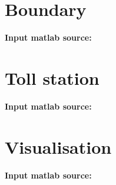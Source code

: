 \documentclass{mcmthesis}
\begin{document}
\begin{appendices}
\section{Boundary}
\textbf{\textcolor[rgb]{0.98,0.00,0.00}{Input matlab source:}}


\section{Toll station}
\textbf{\textcolor[rgb]{0.98,0.00,0.00}{Input matlab source:}}


\section{Visualisation}
\textbf{\textcolor[rgb]{0.98,0.00,0.00}{Input matlab source:}}


\end{appendices}


\nocite{*}



	
\end{document}

